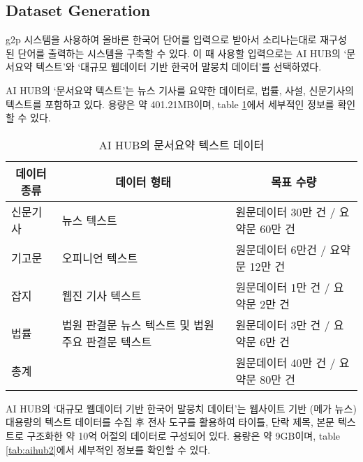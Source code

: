 \documentclass[11pt]{article}
\begin{document}
\subsection{Dataset Generation}
g2p 시스템을 사용하여 올바른 한국어 단어를 입력으로 받아서 소리나는대로 재구성 된 단어를 출력하는 시스템을 구축할 수 있다.
이 때 사용할 입력으로는 AI HUB의 `문서요약 텍스트'와 `대규모 웹데이터 기반 한국어 말뭉치 데이터'를 선택하였다.

AI HUB의 `문서요약 텍스트'는 뉴스 기사를 요약한 데이터로, 법률, 사설, 신문기사의 텍스트를 포함하고 있다.
용량은 약 401.21MB이며, table \ref{tab:aihub1}에서 세부적인 정보를 확인할 수 있다.

\begin{table}[h]
    \centering
    \begin{tabular}{lll}
        \multicolumn{1}{c}{\textbf{데이터 종류}} & \multicolumn{1}{c}{\textbf{데이터 형태}} & \multicolumn{1}{c}{\textbf{목표 수량}} \\ \hline
        신문기사                                & 뉴스 텍스트                              & 원문데이터 30만 건 / 요약문 60만 건            \\
        기고문                                 & 오피니언 텍스트                            & 원문데이터 6만건 / 요약문 12만 건              \\
        잡지                                  & 웹진 기사 텍스트                           & 원문데이터 1만 건 / 요약문 2만 건              \\
        법률                                  & 법원 판결문 뉴스 텍스트 및 법원 주요 판결문 텍스트       & 원문데이터 3만 건 / 요약문 6만 건              \\
        \multicolumn{2}{l}{총계}              & 원문데이터 40만 건 / 요약문 80만 건
    \end{tabular}
    \caption{AI HUB의 문서요약 텍스트 데이터}
    \label{tab:aihub1}
\end{table}

AI HUB의 `대규모 웹데이터 기반 한국어 말뭉치 데이터'는 웹사이트 기반 (메가 뉴스) 대용량의 텍스트 데이터를 수집 후 전사 도구를 활용하여 타이틀, 단락 제목, 본문 텍스트로 구조화한 약 10억 어절의 데이터로 구성되어 있다. 용량은 약 9GB이며, table \ref{tab:aihub2}에서 세부적인 정보를 확인할 수 있다.
\end{document}
